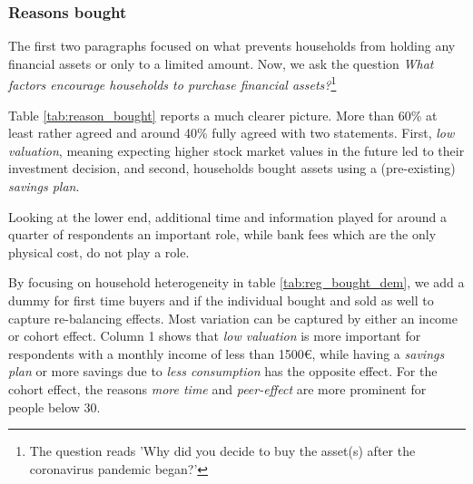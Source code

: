 \documentclass[ProjectABM]{subfiles}
\begin{document}
\subsubsection{Reasons bought}
The first two paragraphs focused on what prevents households from holding any financial assets or only to a limited amount. Now, we ask the question \textit{What factors encourage households to purchase financial assets?}\footnote{The question reads 'Why did you decide to buy the asset(s) after the coronavirus pandemic began?'}



Table \ref{tab:reason_bought} reports a much clearer picture. More than 60\% at least rather agreed and around 40\% fully agreed with two statements. First, \textit{low valuation}, meaning expecting higher stock market values in the future led to their investment decision, and second, households bought assets using a (pre-existing) \textit{savings plan}. %

Looking at the lower end, additional time and information played for around a quarter of respondents an important role, while bank fees which are the only physical cost, do not play a role. %



By focusing on household heterogeneity in table \ref{tab:reg_bought_dem}, we add a dummy for first time buyers and if the individual bought and sold as well to capture re-balancing effects. Most variation can be captured by either an income or cohort effect. Column 1 shows that \textit{low valuation} is more important for respondents with a monthly income of less than 1500\euro, while having a \textit{savings plan} or more savings due to \textit{less consumption} has the opposite effect. For the cohort effect, the reasons \textit{more time} and \textit{peer-effect} are more prominent for people below 30.
\end{document}
